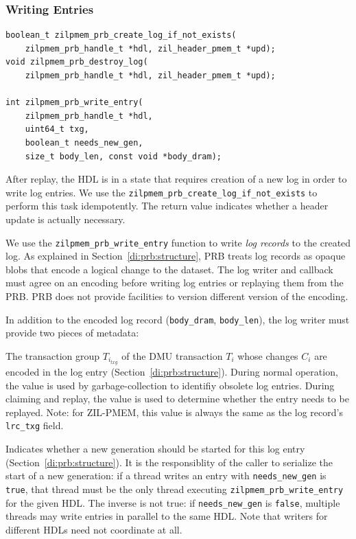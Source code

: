 \documentclass[12pt,a4paper,twoside]{book}
\begin{document}
\subsubsection{Writing Entries}

\begin{lstlisting}
boolean_t zilpmem_prb_create_log_if_not_exists(
    zilpmem_prb_handle_t *hdl, zil_header_pmem_t *upd);
void zilpmem_prb_destroy_log(
    zilpmem_prb_handle_t *hdl, zil_header_pmem_t *upd);

int zilpmem_prb_write_entry(
    zilpmem_prb_handle_t *hdl,
    uint64_t txg,
    boolean_t needs_new_gen,
    size_t body_len, const void *body_dram);
\end{lstlisting}

After replay, the HDL is in a state that requires creation of a new log in order to write log entries.
We use the \lstinline{zilpmem_prb_create_log_if_not_exists} to perform this task idempotently.
The return value indicates whether a header update is actually necessary.

We use the \lstinline{zilpmem_prb_write_entry} function to write \textit{log records} to the created log.
As explained in Section~\ref{di:prb:structure}, PRB treats log records as opaque blobs that encode a logical change to the dataset.
The log writer and callback must agree on an encoding before writing log entries or replaying them from the PRB.
PRB does not provide facilities to version different version of the encoding.

In addition to the encoded log record (\lstinline{body_dram}, \lstinline{body_len}), the log writer must provide two pieces of metadata:
\begin{description}[noitemsep,leftmargin=1.5cm,labelindent=1cm]
    \item[txg] The transaction group $T_{i_{txg}}$ of the DMU transaction $T_i$ whose changes $C_i$ are encoded in the log entry (Section~\ref{di:prb:structure}).
        During normal operation, the value is used by garbage-collection to identifiy obsolete log entries.
        During claiming and replay, the value is used to determine whether the entry needs to be replayed.
        Note: for ZIL-PMEM, this value is always the same as the log record's \lstinline{lrc_txg} field.
    \item[needs\_new\_gen] Indicates whether a new generation should be started for this log entry (Section~\ref{di:prb:structure}).
        It is the responsiblity of the caller to serialize the start of a new generation:
        if a thread writes an entry with \lstinline{needs_new_gen} is \lstinline{true}, that thread must be the only thread executing \lstinline{zilpmem_prb_write_entry} for the given HDL.
        The inverse is not true: if \lstinline{needs_new_gen} is \lstinline{false}, multiple threads may write entries in parallel to the same HDL.
        Note that writers for different HDLs need not coordinate at all.
\end{description}
\end{document}
